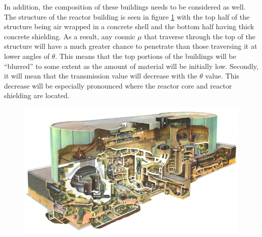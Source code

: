 

In addition, the composition of these buildings needs to be considered as well. The structure of the reactor building is seen in figure \ref{fig:wylfaReactorRoughStructure} with the top half of the structure being air wrapped in a concrete shell and the bottom half having thick concrete shielding. As a result, any cosmic $\mu$ that traverse through the top of the structure will have a much greater chance to penetrate than those traversing it at lower angles of $\theta$. This means that the top portions of the buildings will be ``blurred'' to some extent as the amount of material will be initially low. Secondly, it will mean that the transmission value will decrease with the $\theta$ value. This decrease will be especially pronounced where the reactor core and reactor shielding are located. 

\begin{figure}[!h]
 \centering
 \includegraphics[width=0.7\linewidth]{Chapter5/Figs/wylfaRasterNew/wylfaReactorRoughStructure.png}
 \label{fig:wylfaReactorRoughStructure}
\end{figure}

